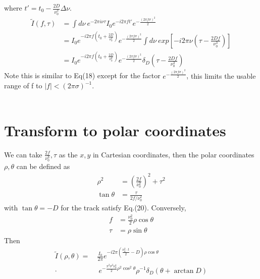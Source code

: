 \documentclass[twocolumn]{aastex61}
\begin{document}
where $t'=t_0 - \frac{2D}{\nu _0 ^3}\Delta \nu$.  
\begin{equation}
\begin{aligned}
\widetilde{I}(f,\tau)  & = \int d\nu~ e^{-2\pi i\nu \tau}I_0  e^{-i2\pi ft'}e^{-\frac{(2\pi f\sigma)^2}{2}} \\
&= I_0e^{-i2\pi f(t_0 + \frac{2D}{\nu _0 ^2})}e^{-\frac{(2\pi f\sigma)^2}{2}}\int d\nu~exp[-i2\pi\nu(\tau - \frac{2Df}{\nu ^3_0})] \\
&= {I_0} e^{-i2\pi f(t_0+\frac{2D}{\nu ^2 _0})}e^{-\frac{(2\pi f\sigma)^2}{2}}\delta _D (\tau - \frac{2Df}{\nu ^3 _0})
\end{aligned}
\end{equation}
Note this is similar to Eq(18) except for the factor $e^{-\frac{(2\pi f \sigma)^2}{2}}$,  {\color{red}this limits the usable range of f to $|f|<(2\pi\sigma)^{-1}$. }
\\ \\

\section{Transform to polar coordinates}
\label{sec:discussion}
We can take $\frac{2f}{\nu _0 ^3},\tau$ as the $x,y$ in Cartesian coordinates, then the polar coordinates $\rho,\theta$ can be defined as 
\begin{equation}
\begin{aligned}
\rho ^2 &= \left(\frac{2f}{\nu _0 ^2}\right) ^2 + \tau ^2 \\
\tan\theta &= \frac{\tau}{2f/\nu ^2 _0} 
\end{aligned}
\end{equation}
with $\tan \theta = -D$ for the track satisfy Eq.(20). Conversely, 
\begin{equation}
\begin{aligned}
f &= \frac{\nu ^2 _0}{2}\rho \cos\theta \\
\tau &= \rho \sin \theta
\end{aligned}
\end{equation}
Then 
\begin{equation}
\begin{aligned}
\widetilde{I}(\rho, \theta) = ~&\frac{I_0}{2\pi}e^{-i2\pi\left(\frac{\nu ^2 _0\cdot t}{2}-D \right)\rho\cos\theta}~\\ 
\cdot & ~e^{-\frac{\pi^2\sigma ^2 \nu _0 ^4}{2}\rho ^2 \cos ^2 \theta}\rho ^{-1} \delta _D (\theta + \arctan D)
\end{aligned}
\end{equation}
\end{document}
